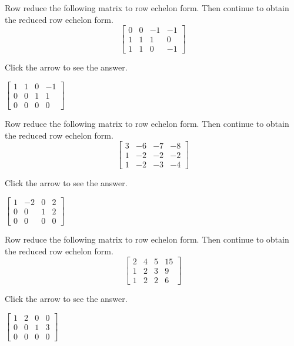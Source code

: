 \documentclass{ximera}
\begin{document}
\begin{problem}\label{prb:2.19} Row reduce the following matrix to row echelon form. Then continue to obtain the reduced row echelon form.
\begin{equation*}
\left[
\begin{array}{rrrr}
0 & 0 & -1 & -1 \\
1 & 1 & 1 & 0 \\
1 & 1 & 0 & -1
\end{array}
\right]
\end{equation*}

Click the arrow to see the answer. 
\begin{expandable}
$\begin{bmatrix}1 & 1&0&-1\\0&0&1&1\\0&0&0&0\end{bmatrix}$
\end{expandable}
\end{problem}

\begin{problem}\label{prb:2.20} Row reduce the following matrix to row echelon form. Then continue to obtain the reduced row echelon form.
\begin{equation*}
\left[
\begin{array}{rrrr}
3 & -6 & -7 & -8 \\
1 & -2 & -2 & -2 \\
1 & -2 & -3 & -4
\end{array}
\right]
\end{equation*}

Click the arrow to see the answer. 
\begin{expandable}
$\begin{bmatrix}1 & -2&0&2\\0&0&1&2\\0&0&0&0\end{bmatrix}$
\end{expandable}

\end{problem}

\begin{problem}\label{prb:2.21} Row reduce the following matrix to row echelon form. Then continue to obtain the reduced row echelon form.
\begin{equation*}
\left[
\begin{array}{rrrr}
2 & 4 & 5 & 15 \\
1 & 2 & 3 & 9 \\
1 & 2 & 2 & 6
\end{array}
\right]
\end{equation*}

Click the arrow to see the answer. 
\begin{expandable}
$\begin{bmatrix}1 & 2&0&0\\0&0&1&3\\0&0&0&0\end{bmatrix}$
\end{expandable}
\end{problem}
\end{document}

